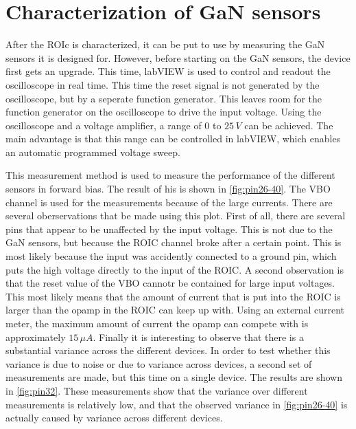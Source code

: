 \section{Characterization of GaN sensors}
After the ROIc is characterized, it can be put to use by measuring the GaN sensors it is designed for. However, before starting on the GaN sensors, the device first gets an upgrade. This time, labVIEW is used to control and readout the oscilloscope in real time. This time the reset signal is not generated by the oscilloscope, but by a seperate function generator. This leaves room for the function generator on the oscilloscope to drive the input voltage. Using the oscilloscope and a voltage amplifier, a range of 0 to $25\,V$ can be achieved. The main advantage is that this range can be controlled in labVIEW, which enables an automatic programmed voltage sweep. 

This measurement method is used to measure the performance of the different sensors in forward bias. The result of his is shown in \cref{fig:pin26-40}. The VBO channel is used for the measurements because of the large currents. There are several oberservations that be made using this plot. First of all, there are several pins that appear to be unaffected by the input voltage. This is not due to the GaN sensors, but because the ROIC channel broke after a certain point. This is most likely because the input was accidently connected to a ground pin, which puts the high voltage directly to the input of the ROIC. A second observation is that the reset value of the VBO cannotr be contained for large input voltages. This most likely means that the amount of current that is put into the ROIC is larger than the opamp in the ROIC can keep up with. Using an external current meter, the maximum amount of current the opamp can compete with is approximately $15\,\mu A$. Finally it is interesting to observe that there is a substantial variance across the different devices. In order to test whether this variance is due to noise or due to variance across devices, a second set of measurements are made, but this time on a single device. The results are shown in \cref{fig:pin32}. These measurements show that the variance over different measurements is relatively low, and that the observed variance in \cref{fig:pin26-40} is actually caused by variance across different devices.


